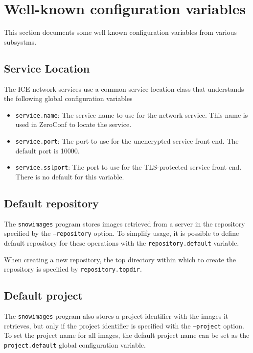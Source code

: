 \section{Well-known configuration variables}
This section documents some well known configuration variables from 
various subsystms.
\subsection{Service Location}
The ICE network services use a common service location class that
understands the following global configuration variables
\begin{itemize}
\item
\texttt{service.name}:
The service name to use for the network service.
This name is used in ZeroConf to locate the service.
\item
\texttt{service.port}:
The port to use for the unencrypted service front end.
The default port is 10000.
\item
\texttt{service.sslport}:
The port to use for the TLS-protected service front end.
There is no default for this variable.
\end{itemize}

\subsection{Default repository}
The \texttt{snowimages} program stores images retrieved from a server
in the repository specified by the \texttt{--repository} option.
To simplify usage, it is possible to define default repository
for these operations with the \texttt{repository.default} variable.

When creating a new repository, the top directory within which to create
the repository is specified by \texttt{repository.topdir}.

\subsection{Default project}
The \texttt{snowimages} program also stores a project identifier with
the images it retrieves, but only if the project identifier is specified
with the \texttt{--project} option.
To set the project name for all images, the default project name can
be set as the \texttt{project.default} global configuration variable.



